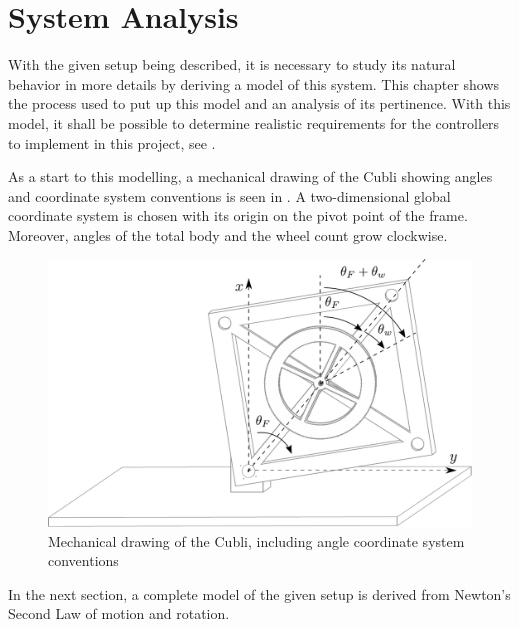 \chapter{System Analysis}
With the given setup  being described, it is necessary to study its natural behavior in more details by deriving a model of this system. This chapter shows the process used to put up this model and an analysis of its pertinence. With this model, it shall be possible to determine realistic requirements for the controllers to implement in this project, see  .

As a start to this modelling, a mechanical drawing of the Cubli showing angles and coordinate system conventions is seen in . A two-dimensional global coordinate system is chosen with its origin on the pivot point of the frame. Moreover, angles of the total body and the wheel count grow clockwise.

\begin{figure}[H]
 \centering
 \includegraphics[scale=0.6]{figures/mechanicalSystem}
 \caption{Mechanical drawing of the Cubli, including angle coordinate system conventions}
 \label{cubliMechanical}
\end{figure}

In the next section, a complete model of the given setup is derived from Newton's Second Law of motion and rotation.